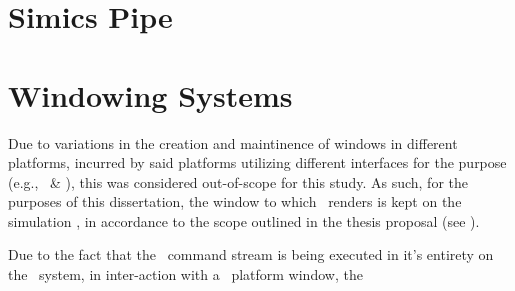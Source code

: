 \section{Simics Pipe}
\label{sec:methodologysolution_simicspipe}

\section{Windowing Systems}
\label{sec:methodologysolution_windowingsystems}

Due to variations in the creation and maintinence of windows in different platforms, incurred by said platforms utilizing different interfaces for the purpose (e.g., \dvttermfedora\ \& \dvttermandroid ), this was considered out-of-scope for this study.
As such, for the purposes of this dissertation, the window to which \dvttermopengl\ renders is kept on the simulation \dvttermhost , in accordance to the scope outlined in the thesis proposal (see ).

Due to the fact that the \dvttermopengl\ command stream is being executed in it's entirety on the \dvttermhost\ system, in inter-action with a \dvttermhost\ platform window, the 

